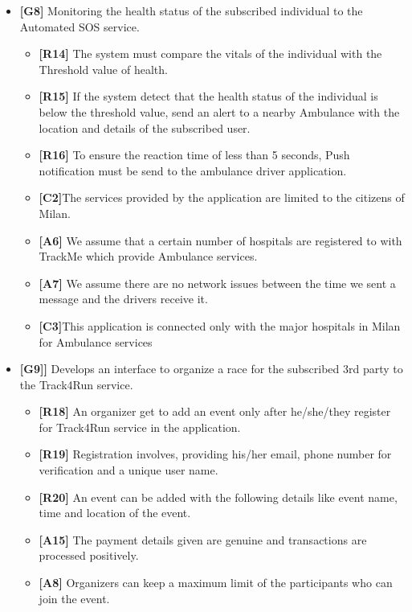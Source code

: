 \begin{itemize}
\item\textbf{[G8]} Monitoring the health status of the subscribed individual to the Automated SOS service.

\begin{itemize}
\item\textbf{[R14]} The system must compare the vitals of the individual with the Threshold value of health.
\item\textbf{[R15]} If the system detect that the health status of the individual is below the threshold value, send an alert to a nearby Ambulance with the location and details of the subscribed user.
\item\textbf{[R16]} To ensure the reaction time of less than 5 seconds, Push notification must be send to the ambulance driver application.
\item\textbf{[C2]}The services provided by the application are limited to the citizens of Milan.
\item \textbf{[A6]} We assume that a certain number of hospitals are registered to with TrackMe which provide Ambulance services.
\item \textbf{[A7]} We assume there are no network issues between the time we sent a message and the drivers receive it.
\item\textbf{[C3]}This application is connected only with the major hospitals in Milan for Ambulance services\newline
\end{itemize}

\item\textbf{[G9]]}  Develops an interface to organize a race for the subscribed 3rd party to the Track4Run service.

\begin{itemize}
\item\textbf{[R18]} An organizer get to add an event only after he/she/they register for Track4Run service in the application.
\item\textbf{[R19]} Registration involves, providing his/her email, phone number for verification and a unique user name.
\item\textbf{[R20]} An event can be added with the following details like event name, time and location of the event.
\item\textbf{[A15]} The payment details given are genuine and transactions are processed positively.
\item\textbf{[A8]} Organizers can keep a maximum limit of the participants who can join the event.\newline
\end{itemize}


\end{itemize}
